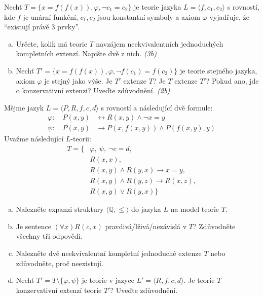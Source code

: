 \begin{problem}

    Nechť $T=\{x=f(f(x)),\varphi, \neg c_1 = c_2\}$ je teorie jazyka $L=\langle f,c_1,c_2\rangle$ s rovností, kde $f$ je unární funkční, $c_1,c_2$ jsou konstantní symboly a axiom $\varphi$ vyjadřuje, že ``existují právě $3$ prvky''.
    \begin{enumerate}[(a)]    
        \item Určete, kolik má teorie $T$ navzájem neekvivalentních jednoduchých kompletních extenzí. Napište dvě z nich. {\it (3b)}
        \item Nechť $T'=\{x=f(f(x)),\varphi,\neg f(c_1)=f(c_2)\}$ je teorie stejného jazyka, axiom $\varphi$ je stejný jako výše. Je $T'$ extenze $T$? Je $T$ extenze $T'$? Pokud ano, jde o konzervativní extenzi? Uveďte zdůvodnění. {\it (2b)}
    \end{enumerate}
    
\end{problem}


\begin{problem}

    Mějme jazyk $L=\langle P,R,f,c,d\rangle$ s rovností a následující dvě formule:
    \begin{align*}
        \varphi:\quad P(x,y) &\leftrightarrow R(x,y) \wedge \neg x=y\\
        \psi:\quad P(x,y) &\to P(x,f(x,y)) \wedge P(f(x,y),y)
    \end{align*}
    Uvažme následující $L$-teorii:
    \begin{align*}
        T=\{&\varphi,\ \psi,\ \neg c=d,\\
        &R(x,x),\\ 
        &R(x,y) \wedge R(y,x) \to x=y,\\
        &R(x,y) \wedge R(y,z) \to R(x,z),\\
        &R(x,y) \vee R(y,x)\}    
    \end{align*}
    

    \begin{enumerate}[(a)]
        \item Nalezněte expanzi struktury $\langle \mathbb{Q},\le \rangle$ do jazyka $L$ na model teorie $T$.
        \item Je sentence $(\forall x)R(c,x)$ pravdivá/lživá/nezávislá v $T$? Zdůvodněte všechny tři odpovědi.
        \item Nalezněte dvě neekvivalentní kompletní jednoduché extenze $T$ nebo zdůvodněte, proč neexistují.
        \item Nechť $T'=T\setminus\{\varphi,\psi\}$ je teorie v jazyce $L'=\langle R,f,c,d\rangle$. Je teorie $T$ konzervativní extenzí teorie $T'$? Uveďte zdůvodnění.
    \end{enumerate}

\end{problem}

